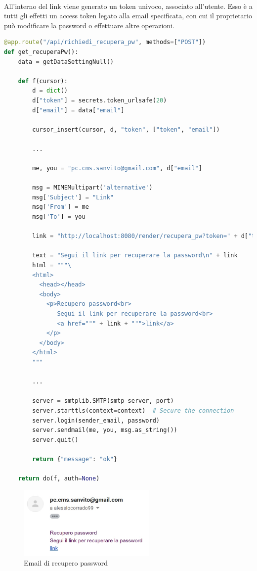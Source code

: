 \documentclass[11pt,a4paper,english]{article}
\begin{document}
\paragraph{} All'interno del link viene generato un token univoco, associato all'utente. Esso è a tutti gli effetti un access token legato alla email specificata, con cui il proprietario può modificare la password o effettuare altre operazioni.  

\begin{lstlisting}[language=Python, caption=endpoint richiedi\_recupera\_pw]
@app.route("/api/richiedi_recupera_pw", methods=["POST"])
def get_recuperaPw():
    data = getDataSettingNull()

    def f(cursor):
        d = dict()
        d["token"] = secrets.token_urlsafe(20)
        d["email"] = data["email"]

        cursor_insert(cursor, d, "token", ["token", "email"])
        
        ...

        me, you = "pc.cms.sanvito@gmail.com", d["email"]

        msg = MIMEMultipart('alternative')
        msg['Subject'] = "Link"
        msg['From'] = me
        msg['To'] = you

        link = "http://localhost:8080/render/recupera_pw?token=" + d["token"]

        text = "Segui il link per recuperare la password\n" + link
        html = """\
        <html>
          <head></head>
          <body>
            <p>Recupero password<br>
               Segui il link per recuperare la password<br>
               <a href=""" + link + """>link</a>
            </p>
          </body>
        </html>
        """

        ...

        server = smtplib.SMTP(smtp_server, port)
        server.starttls(context=context)  # Secure the connection
        server.login(sender_email, password)
        server.sendmail(me, you, msg.as_string())
        server.quit()

        return {"message": "ok"}

    return do(f, auth=None)
\end{lstlisting}


\begin{figure}[H]
    \centering
    \includegraphics[width=0.6\textwidth]{img/email_recupero.jpg}
    \caption{Email di recupero password}
\end{figure}
\end{document}

